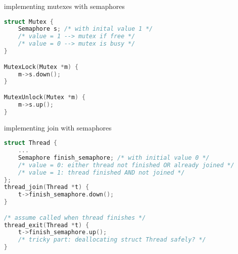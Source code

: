 \begin{frame}[fragile,label=mutexWithSemaphore]{implementing mutexes with semaphores}
\begin{lstlisting}[language=C++,style=small]
struct Mutex {
    Semaphore s; /* with inital value 1 */
    /* value = 1 --> mutex if free */
    /* value = 0 --> mutex is busy */
}

MutexLock(Mutex *m) {
    m->s.down();
}

MutexUnlock(Mutex *m) {
    m->s.up();
}
\end{lstlisting}
\end{frame}


\begin{frame}[fragile,label=threadJoinWithSemaphore]{implementing join with semaphores}
\begin{lstlisting}[language=C++,style=smaller]
struct Thread {
    ...
    Semaphore finish_semaphore; /* with initial value 0 */
    /* value = 0: either thread not finished OR already joined */
    /* value = 1: thread finished AND not joined */
};
thread_join(Thread *t) {
    t->finish_semaphore.down();
}

/* assume called when thread finishes */
thread_exit(Thread *t) {
    t->finish_semaphore.up();
    /* tricky part: deallocating struct Thread safely? */
}
\end{lstlisting}
\end{frame}
